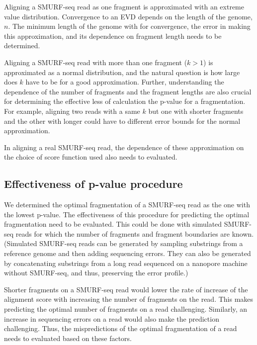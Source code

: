 Aligning a SMURF-seq read as one fragment is approximated with an
extreme value distribution. Convergence to an EVD depends on the length
of the genome, $n$. The minimum length of the genome with for
convergence, the error in making this approximation, and its dependence
on fragment length needs to be determined.

Aligning a SMURF-seq read with more than one fragment ($k > 1$) is
approximated as a normal distribution, and the natural question is how
large does $k$ have to be for a good approximation. Further,
understanding the dependence of the number of fragments and the fragment
lengths are also crucial for determining the effective less of
calculation the p-value for a fragmentation. For example, aligning two
reads with a same $k$ but one with shorter fragments and the other with
longer could have to different error bounds for the normal approximation.

In aligning a real SMURF-seq read, the dependence of these approximation
on the choice of score function used also needs to evaluated.


\subsection*{Effectiveness of p-value procedure}
We determined the optimal fragmentation of a SMURF-seq read as the one
with the lowest p-value. The effectiveness of this procedure for
predicting the optimal fragmentation need to be evaluated. This could be
done with simulated SMURF-seq reads for which the number of fragments
and fragment boundaries are known. (Simulated SMURF-seq reads can be
generated by sampling substrings from a reference genome and then adding
sequencing errors. They can also be generated by concatenating
substrings from a long read sequenced on a nanopore machine without
SMURF-seq, and thus, preserving the error profile.)

Shorter fragments on a SMURF-seq read would lower the rate of increase
of the alignment score with increasing the number of fragments on the
read. This makes predicting the optimal number of fragments on a read
challenging.
Similarly, an increase in sequencing errors on a read would also make
the prediction challenging.
%
Thus, the mispredictions of the optimal fragmentation of a read needs to
evaluated based on these factors.

